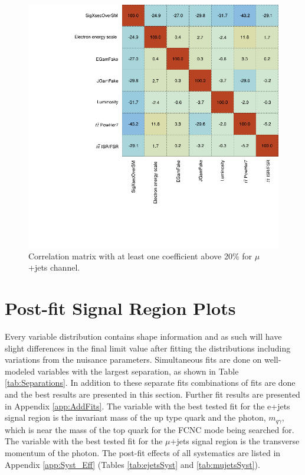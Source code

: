 \begin{figure}[h!]
	\centering
	\includegraphics[width=.5\columnwidth]{../ThesisImages/RegionPlots/FinalRegions/Systematics/MQGamEJetPHptMJet/FCNC_All_mujets/CorrMatrix.png}
	\caption[Correlation matrix  with at least one coefficient above 20\% for $\mu$+jets channel]{Correlation matrix  with at least one coefficient above 20\% for $\mu$+jets channel. }
	\label{fig:Corrmujets}
\end{figure}

\section{Post-fit Signal Region Plots}
\label{sec:PostFitSR}
Every variable distribution contains shape information and as such will have slight differences in the final limit value after fitting the distributions including variations from the nuisance parameters.  Simultaneous fits are done on well-modeled variables with the largest separation, as shown in Table \ref{tab:Separations}.  In addition to these separate fits combinations of fits are done and the best results are presented in this section.  Further fit results are presented in Appendix \ref{app:AddFits}. The variable with the best tested fit for the e+jets signal region is the invariant mass of the up type quark and the photon, $m_{q\gamma}$, which is near the mass of the top quark for the FCNC mode being searched for. The variable with the best tested fit for the $\mu$+jets signal region is the transverse momentum of the photon.  The post-fit effects of all systematics are listed in Appendix \ref{app:Syst_Eff} (Tables \ref{tab:ejetsSyst} and \ref{tab:mujetsSyst}).

